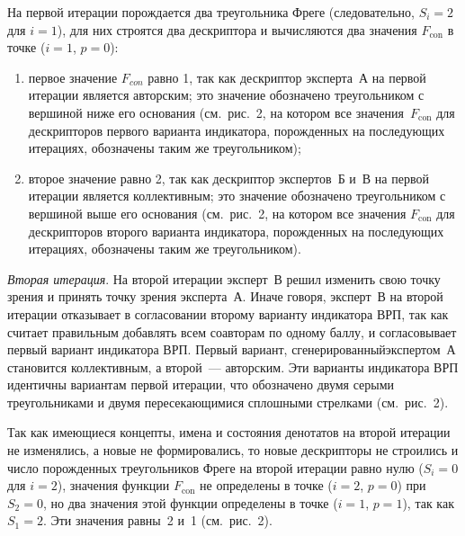 \begin{multicols}{2}
   На первой итерации порождается два треугольника Фреге (следовательно, $S_i=2$ для 
$i = 1$), для них строятся два дескриптора и вычисляются два значения $F_{\mathrm{con}}$ в точке 
($i = 1$, $p = 0$):
   \begin{enumerate}[(1)]
\item первое значение $F_{con}$ равно 1, так как дескриптор эксперта~{А} на 
первой итерации является авторским; это значение обозначено треугольником с 
вершиной ниже его основания (см.\ рис.~2, на котором все значения~$F_{\mathrm{con}}$ для 
дескрипторов первого варианта индикатора, порожденных на последующих итерациях, 
обозначены таким же треугольником);
\item второе значение равно 2, так как дескриптор экспертов~{Б} и~{В} на 
первой итерации является коллективным; это значение обозначено треугольником с 
вершиной выше его основания (см.\ рис.~2, на котором все значения $F_{\mathrm{con}}$ для 
дескрипторов второго варианта индикатора, порожденных на последующих итерациях, 
обозначены таким же треугольником).
\end{enumerate}

   
   \textit{Вторая итерация}. На второй итерации эксперт~{В} решил изменить свою 
точку зрения и принять точку зрения эксперта~{А}. Иначе говоря, эксперт~{В} на 
второй итерации отказывает в согласовании второму варианту индикатора ВРП, так как 
считает правильным добавлять всем соавторам по одному\linebreak
 баллу, и согласовывает первый 
вариант индика\-тора ВРП. Первый вариант, сгенерированный\linebreak экспертом~{А} 
становится коллективным, а второй~--- ав\-тор\-ским. Эти варианты индикатора ВРП 
идентичны вариантам первой итерации, что обозначено двумя серыми треугольниками и двумя 
пересе\-ка\-ющи\-ми\-ся сплошными стрелками (см.\ рис.~2).
   
   Так как имеющиеся концепты, имена и состояния денотатов на второй итерации не 
изменялись, а новые не формировались, то новые дескрипторы не строились и число 
порожденных треугольников Фреге на второй итерации равно нулю ($S_i = 0$ для $i = 2$), 
значения функции $F_{\mathrm{con}}$ не определены в точке ($i = 2$, $p = 0$) при $S_2 = 0$, но два 
значения этой функции определены в точке ($i = 1$, $p = 1$), так как $S_1 = 2$. Эти значения 
равны~2 и~1 (см.\ рис.~2).
   
   

\end{multicols}
